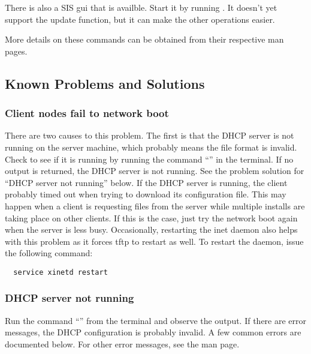 There is also a SIS gui that is availble. Start it by running
. It doesn't yet support the update function, but it can
make the other operations easier.

More details on these commands can be obtained from their respective
man pages.


\subsection{Known Problems and Solutions}
\label{app:troubleshooting-known-problems}

\subsubsection{Client nodes fail to network boot}
\label{app:troubleshooting-known-problems-dhcp}

There are two causes to this problem. The first is that the DHCP
server is not running on the server machine, which probably means the
 file format is invalid.  Check to see if it is
running by running the command ``'' in the
terminal.  If no output is returned, the DHCP server is not running.
See the problem solution for ``DHCP server not running'' below. If the
DHCP server is running, the client probably timed out when trying to
download its configuration file. This may happen when a client is
requesting files from the server while multiple installs are taking
place on other clients. If this is the case, just try the network boot
again when the server is less busy. Occasionally, restarting the inet
daemon also helps with this problem as it forces tftp to restart as
well. To restart the daemon, issue the following command:

\begin{verbatim}
  service xinetd restart
\end{verbatim}

\subsubsection{DHCP server not running}

Run the command ``'' from the terminal and
observe the output. If there are error messages, the DHCP
configuration is probably invalid. A few common errors are documented
below. For other error messages, see the  man page.

